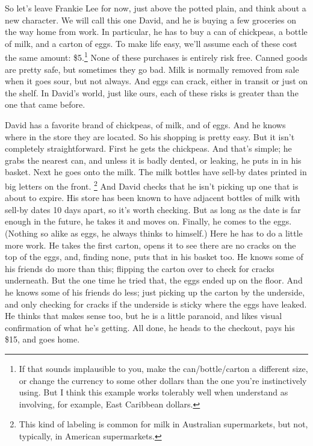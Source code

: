 \documentclass[
  12pt,
  letterpaper,
]{scrbook}
\begin{document}
So let's leave Frankie Lee for now, just above the potted plain, and
think about a new character. We will call this one David, and he is
buying a few groceries on the way home from work. In particular, he has
to buy a can of chickpeas, a bottle of milk, and a carton of eggs. To
make life easy, we'll assume each of these cost the same amount:
\$5.\footnote{If that sounds implausible to you, make the
  can/bottle/carton a different size, or change the currency to some
  other dollars than the one you're instinctively using. But I think
  this example works tolerably well when understand as involving, for
  example, East Caribbean dollars.} None of these purchases is entirely
risk free. Canned goods are pretty safe, but sometimes they go bad. Milk
is normally removed from sale when it goes sour, but not always. And
eggs can crack, either in transit or just on the shelf. In David's
world, just like ours, each of these risks is greater than the one that
came before.

David has a favorite brand of chickpeas, of milk, and of eggs. And he
knows where in the store they are located. So his shopping is pretty
easy. But it isn't completely straightforward. First he gets the
chickpeas. And that's simple; he grabs the nearest can, and unless it is
badly dented, or leaking, he puts in in his basket. Next he goes onto
the milk. The milk bottles have sell-by dates printed in big letters on
the front. \footnote{This kind of labeling is common for milk in
  Australian supermarkets, but not, typically, in American supermarkets.}
And David checks that he isn't picking up one that is about to expire.
His store has been known to have adjacent bottles of milk with sell-by
dates 10 days apart, so it's worth checking. But as long as the date is
far enough in the future, he takes it and moves on. Finally, he comes to
the eggs. (Nothing so alike as eggs, he always thinks to himself.) Here
he has to do a little more work. He takes the first carton, opens it to
see there are no cracks on the top of the eggs, and, finding none, puts
that in his basket too. He knows some of his friends do more than this;
flipping the carton over to check for cracks underneath. But the one
time he tried that, the eggs ended up on the floor. And he knows some of
his friends do less; just picking up the carton by the underside, and
only checking for cracks if the underside is sticky where the eggs have
leaked. He thinks that makes sense too, but he is a little paranoid, and
likes visual confirmation of what he's getting. All done, he heads to
the checkout, pays his \$15, and goes home.
\end{document}
